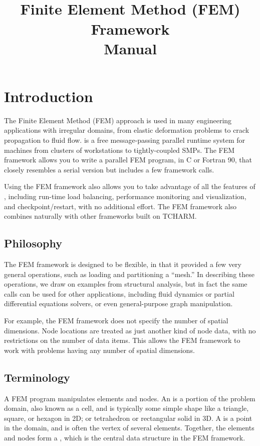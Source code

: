 \documentclass[10pt]{article}
\title{\charmpp\\ Finite Element Method (FEM) Framework\\ Manual}
\begin{document}
\maketitle

\section{Introduction}

The Finite Element Method (FEM) approach is used in many engineering
applications with irregular domains, from elastic deformation problems to
crack propagation to fluid flow.  \charmpp{} is a free message-passing parallel
runtime system for machines from clusters of workstations to tightly-coupled
SMPs.  The \charmpp{} FEM framework allows you to write a parallel FEM program,
in C or Fortran 90, that closely resembles a serial version but includes
a few framework calls.

Using the FEM framework also allows you to take advantage of all the
features of \charmpp, including run-time load balancing,  performance
monitoring and visualization, and checkpoint/restart, with no additional
effort. The FEM framework also combines naturally with other \charmpp
frameworks built on TCHARM.

\subsection{Philosophy}

The \charmpp{} FEM framework is designed to be flexible, in that it
provided a few very general operations, such as loading and partitioning 
a ``mesh.''  
In describing these operations, we draw on examples from structural analysis,
but in fact the same calls can be used for other applications, including
fluid dynamics or partial differential equations solvers, or
even general-purpose graph manipulation.

For example, the FEM framework does not specify the number of spatial
dimensions.  Node locations are treated as just another kind of node data,
with no restrictions on the number of data items.
This allows the FEM framework to work with problems having any number 
of spatial dimensions.


\subsection{Terminology}

A FEM program manipulates elements and nodes. An  is a portion of
the problem domain, also known as a cell, and is typically some simple shape 
like a triangle, square, or hexagon in 2D; or tetrahedron or rectangular solid in 3D.  
A  is a point in the domain, and is often the vertex of several elements.  
Together, the elements and nodes form a , which is the 
central data structure in the FEM framework.
\end{document}
